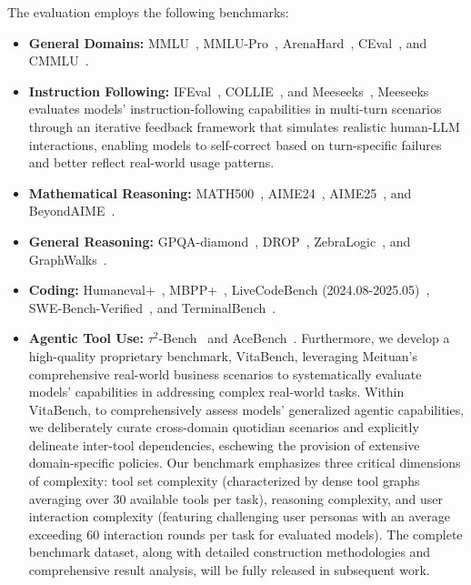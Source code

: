 \documentclass{article}
\begin{document}
The evaluation employs the following benchmarks:
\begin{itemize}
    \item \textbf{General Domains:} MMLU~\citep{hendrycks2021measuringmassivemultitasklanguage}, MMLU-Pro~\citep{wang2024mmluprorobustchallengingmultitask}, 
    ArenaHard~\citep{li2024crowdsourced, arenahard2024}, CEval~\citep{huang2023ceval}, and CMMLU~\citep{li2023cmmlu}.
    \item \textbf{Instruction Following:} IFEval~\citep{zhou2023ifeval}, COLLIE~\citep{yao2024collie}, and Meeseeks~\citep{meeseeks}, Meeseeks evaluates models' instruction-following capabilities in multi-turn scenarios through an iterative feedback framework that simulates realistic human-LLM interactions, enabling models to self-correct based on turn-specific failures and better reflect real-world usage patterns.
    \item \textbf{Mathematical Reasoning:}  MATH500~\citep{math500}, AIME24~\citep{AIME24}, AIME25~\citep{AIME25}, and BeyondAIME~\citep{bytedance_seed_2025_beyondaime}.
    \item \textbf{General Reasoning:}  GPQA-diamond~\citep{rein2023gpqagraduatelevelgoogleproofqa}, DROP~\citep{drop}, ZebraLogic~\citep{lin2025zebralogic}, and GraphWalks~\citep{graphwalks}.
    \item \textbf{Coding:}  Humaneval+~\citep{humanevalmbppplus}, MBPP+~\citep{humanevalmbppplus}, 
    LiveCodeBench (2024.08-2025.05)~\citep{jain2025livecodebench}, 
    SWE-Bench-Verified~\citep{jimenez2024swebench}, and TerminalBench~\citep{tbench_2025}.
    \item \textbf{Agentic Tool Use:}  $\tau^2$-Bench~\citep{tau2-bench} and AceBench~\citep{chen2025acebench}. Furthermore, we develop a high-quality proprietary benchmark, VitaBench, leveraging Meituan's comprehensive real-world business scenarios to systematically evaluate models' capabilities in addressing complex real-world tasks. Within VitaBench, to comprehensively assess models' generalized agentic capabilities, we deliberately curate cross-domain quotidian scenarios and explicitly delineate inter-tool dependencies, eschewing the provision of extensive domain-specific policies. Our benchmark emphasizes three critical dimensions of complexity: tool set complexity (characterized by dense tool graphs averaging over 30 available tools per task), reasoning complexity, and user interaction complexity (featuring challenging user personas with an average exceeding 60 interaction rounds per task for evaluated models). The complete benchmark dataset, along with detailed construction methodologies and comprehensive result analysis, will be fully released in subsequent work.
\end{itemize}
\end{document}
